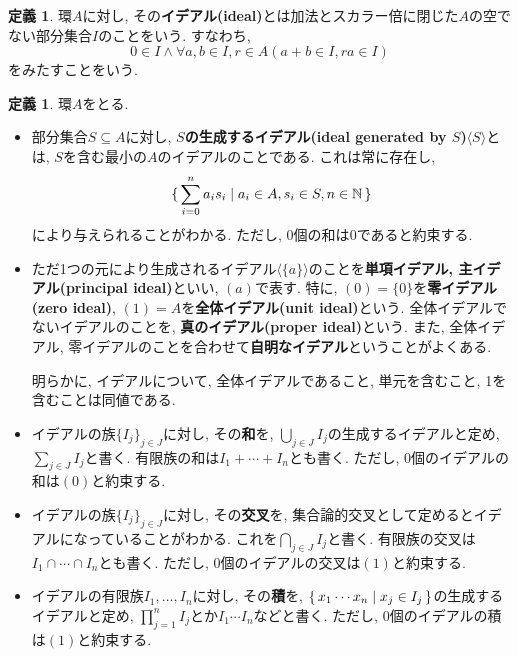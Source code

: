 \documentclass[a4paper, twoside]{bxjsarticle}
\newcommand{\nat}{\mathbb{N}}
\newcommand{\tb}{\textbf}
\theoremstyle{definition}
\newtheorem{defn}[thm]{定義}
\begin{document}
        \begin{defn}
            環$A$に対し, その\tb{イデアル(ideal)}とは加法とスカラー倍に閉じた$A$の空でない部分集合$I$のことをいう. すなわち, 
            \[0\in I \land \forall a, b\in I, r\in A (a+b\in I, ra\in I)\]
            をみたすことをいう.
        \end{defn}
        \begin{defn}
            環$A$をとる.

            \begin{itemize}
                \item 部分集合$S\subseteq A$に対し, \tb{$S$の生成するイデアル(ideal generated by $S$)}$\langle S \rangle$とは, $S$を含む最小の$A$のイデアルのことである. これは常に存在し, \[\set{\sum_{i=0}^n a_i s_i| a_i\in A, s_i \in S, n\in \nat}\]により与えられることがわかる. ただし, 0個の和は$0$であると約束する.
                
                \item ただ1つの元により生成されるイデアル$\langle\{a\}\rangle$のことを\tb{単項イデアル, 主イデアル(principal ideal)}といい, $(a)$で表す. 特に, $(0)=\{0\}$を\tb{零イデアル(zero ideal)}, $(1)=A$を\tb{全体イデアル(unit ideal)}という. 全体イデアルでないイデアルのことを, \tb{真のイデアル(proper ideal)}という. また, 全体イデアル, 零イデアルのことを合わせて\tb{自明なイデアル}ということがよくある.
                
                明らかに, イデアルについて, 全体イデアルであること, 単元を含むこと, 1を含むことは同値である.
                
                \item イデアルの族$\{I_j\}_{j\in J}$に対し, その\tb{和}を, $\bigcup_{j\in J}I_j$の生成するイデアルと定め, $\sum_{j\in J}I_j$と書く. 有限族の和は$I_1+\cdots+I_n$とも書く. ただし, 0個のイデアルの和は$(0)$と約束する.
                
                \item イデアルの族$\{I_j\}_{j\in J}$に対し, その\tb{交叉}を, 集合論的交叉として定めるとイデアルになっていることがわかる. これを$\bigcap_{j\in J}I_j$と書く. 有限族の交叉は$I_1\cap\cdots\cap I_n$とも書く. ただし, 0個のイデアルの交叉は$(1)$と約束する.
                
                \item イデアルの有限族$I_1,\dots, I_n$に対し, その\tb{積}を, $\set{x_1\cdots x_n| x_j\in I_j}$の生成するイデアルと定め, $\prod_{j=1}^n I_j$とか$I_1\cdots I_n$などと書く. ただし, 0個のイデアルの積は$(1)$と約束する.
               

\end{itemize}
\end{defn}
\end{document}
